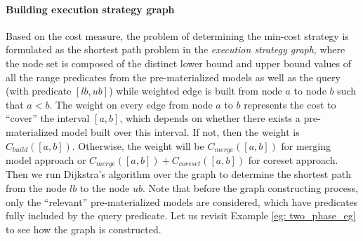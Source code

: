 \paragraph{Building execution strategy graph} Based on the cost measure, the problem of determining the min-cost strategy is formulated as the shortest path problem in the {\em execution strategy graph}, where the node set is composed of the distinct lower bound and upper bound values of all the range predicates from the pre-materialized models as well as the query (with predicate $[lb, ub]$) while weighted edge is built from node $a$ to node $b$ such that $a < b$. The weight on every edge from node $a$ to $b$ represents the cost to ``cover'' the interval $[a,b]$, which depends on whether there exists a pre-materialized model built over this interval. If not, then the weight is $C_{build}([a,b])$. Otherwise, the weight will be $C_{merge}([a,b])$ for merging model approach or $C_{merge}([a,b]) + C_{coreset}([a,b])$ for coreset approach. Then we run Dijkstra's algorithm over the graph to determine the shortest path from the node $lb$ to the node $ub$. Note that before the graph constructing process, only the ``relevant'' pre-materialized models are considered, which have predicates fully included by the query predicate. Let us revisit Example \ref{eg: two_phase_eg} to see how the graph is constructed.

